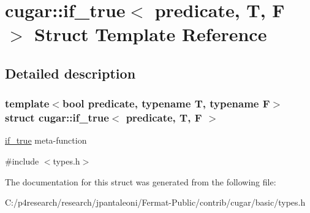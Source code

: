 \hypertarget{structcugar_1_1if__true}{}\section{cugar\+:\+:if\+\_\+true$<$ predicate, T, F $>$ Struct Template Reference}
\label{structcugar_1_1if__true}


\subsection{Detailed description}
\subsubsection*{template$<$bool predicate, typename T, typename F$>$\newline
struct cugar\+::if\+\_\+true$<$ predicate, T, F $>$}

\hyperlink{structcugar_1_1if__true}{if\+\_\+true} meta-\/function 

{\ttfamily \#include $<$types.\+h$>$}



The documentation for this struct was generated from the following file\+:\begin{DoxyCompactItemize}
\item 
C\+:/p4research/research/jpantaleoni/\+Fermat-\/\+Public/contrib/cugar/basic/types.\+h\end{DoxyCompactItemize}
